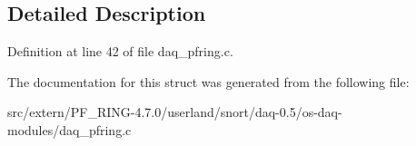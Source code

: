 \subsection{Detailed Description}


Definition at line 42 of file daq\_\-pfring.c.



The documentation for this struct was generated from the following file:\begin{DoxyCompactItemize}
\item 
src/extern/PF\_\-RING-\/4.7.0/userland/snort/daq-\/0.5/os-\/daq-\/modules/daq\_\-pfring.c\end{DoxyCompactItemize}
